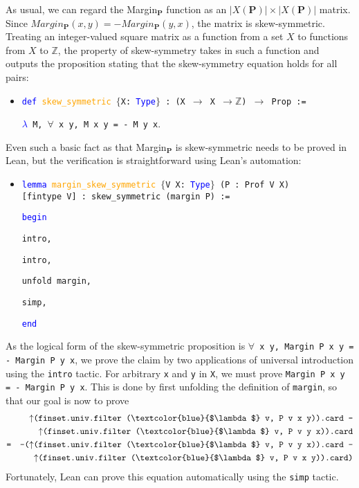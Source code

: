 \documentclass[runningheads]{llncs}
\begin{document}
As usual, we can regard the Margin$_\mathbf{P}$ function as an $|X(\mathbf{P})|\times |X(\mathbf{P})|$ matrix. Since $Margin_\mathbf{P}(x,y)=-Margin_\mathbf{P}(y,x)$, the matrix is skew-symmetric. Treating an integer-valued square matrix as a function from a set $X$ to functions from $X$ to $\mathbb{Z}$, the property of skew-symmetry takes in such a function and outputs the proposition stating that the skew-symmetry equation holds for all pairs:
\begin{itemize}
\item[] \texttt{\textcolor{blue}{def} \textcolor{orange}{skew\_symmetric} $\{$X: \textcolor{blue}{Type}$\}$ : (X $\to$ X $\to \mathbb{Z}$) $\to$ Prop :=} 

\texttt{\textcolor{blue}{$\lambda$} M, $\forall$ x y, M x y = - M y x}.
\end{itemize}
Even such a basic fact as that Margin$_\mathbf{P}$ is skew-symmetric needs to be proved in Lean, but the verification is straightforward using Lean's automation:
\begin{itemize}
\item[] \texttt{\textcolor{blue}{lemma} \textcolor{orange}{margin\_skew\_symmetric} $\{$V X: \textcolor{blue}{Type}$\}$ (P : Prof V X)}\\ \texttt{[fintype V] : skew\_symmetric (margin P) :=} 
 
\texttt{\textcolor{blue}{begin}}

\quad \texttt{intro,}

\quad  \texttt{intro,}

\quad \texttt{unfold margin,}

\quad \texttt{simp,}

\texttt{\textcolor{blue}{end}}
\end{itemize}
As the logical form of the skew-symmetric proposition is \texttt{$\forall$ x y, Margin~P~x~y = - Margin P y x}, we prove the claim by two applications of universal introduction using the \texttt{intro} tactic. For arbitrary \texttt{x} and \texttt{y} in \texttt{X}, we must prove \texttt{Margin~P~x~y = - Margin P y x}. This is done by first unfolding the definition of \texttt{margin}, so that our goal is now to prove  
\begin{eqnarray*}
&&\mbox{\texttt{$\uparrow$(finset.univ.filter (\textcolor{blue}{$\lambda$} v, P v x y)).card -}} \\ 
  &&      \mbox{\texttt{$\uparrow$(finset.univ.filter (\textcolor{blue}{$\lambda$} v, P v y x)).card}}\\
  &\texttt{=}& \mbox{\texttt{-($\uparrow$(finset.univ.filter (\textcolor{blue}{$\lambda$} v, P v y x)).card -}} \\ 
    &&      \mbox{\texttt{$\uparrow$(finset.univ.filter (\textcolor{blue}{$\lambda$} v, P v x y)).card)}}
\end{eqnarray*}
Fortunately, Lean can prove this equation automatically using the \texttt{simp} tactic.
\end{document}
